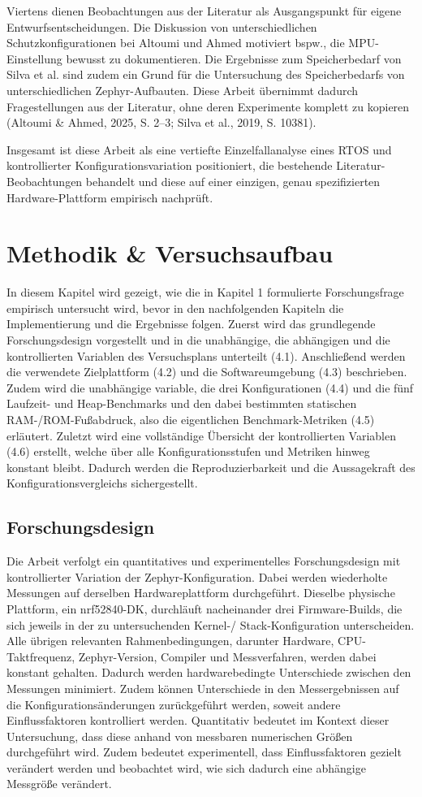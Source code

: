 Viertens dienen Beobachtungen aus der Literatur als Ausgangspunkt für eigene Entwurfsentscheidungen. Die Diskussion von unterschiedlichen Schutzkonfigurationen bei Altoumi und Ahmed motiviert bspw., die MPU-Einstellung bewusst zu dokumentieren. Die Ergebnisse zum Speicherbedarf von Silva et al. sind zudem ein Grund für die Untersuchung des Speicherbedarfs von unterschiedlichen Zephyr-Aufbauten. Diese Arbeit übernimmt dadurch Fragestellungen aus der Literatur, ohne deren Experimente komplett zu kopieren (Altoumi \& Ahmed, 2025, S. 2–3; Silva et al., 2019, S. 10381).

Insgesamt ist diese Arbeit als eine vertiefte Einzelfallanalyse eines RTOS und kontrollierter Konfigurationsvariation positioniert, die bestehende Literatur-Beobachtungen behandelt und diese auf einer einzigen, genau spezifizierten Hardware-Plattform empirisch nachprüft.


\chapter{Methodik \& Versuchsaufbau}
In diesem Kapitel wird gezeigt, wie die in Kapitel 1 formulierte Forschungsfrage empirisch untersucht wird, bevor in den nachfolgenden Kapiteln die Implementierung und die Ergebnisse folgen. Zuerst wird das grundlegende Forschungsdesign vorgestellt und in die unabhängige, die abhängigen und die kontrollierten Variablen des Versuchsplans unterteilt (4.1). Anschließend werden die verwendete Zielplattform (4.2) und die Softwareumgebung (4.3) beschrieben. Zudem wird die unabhängige variable, die drei Konfigurationen (4.4) und die fünf Laufzeit- und Heap-Benchmarks und den dabei bestimmten statischen RAM-/ROM-Fußabdruck, also die eigentlichen Benchmark-Metriken (4.5) erläutert. Zuletzt wird eine vollständige Übersicht der kontrollierten Variablen (4.6) erstellt, welche über alle Konfigurationsstufen und Metriken hinweg konstant bleibt. Dadurch werden die Reproduzierbarkeit und die Aussagekraft des Konfigurationsvergleichs sichergestellt.

\section{Forschungsdesign}
Die Arbeit verfolgt ein quantitatives und experimentelles Forschungsdesign mit kontrollierter Variation der Zephyr-Konfiguration. Dabei werden wiederholte Messungen auf derselben Hardwareplattform durchgeführt. Dieselbe physische Plattform, ein nrf52840-DK, durchläuft nacheinander drei Firmware-Builds, die sich jeweils in der zu untersuchenden Kernel-/ Stack-Konfiguration unterscheiden. Alle übrigen relevanten Rahmenbedingungen, darunter Hardware, CPU-Taktfrequenz, Zephyr-Version, Compiler und Messverfahren, werden dabei konstant gehalten. Dadurch werden hardwarebedingte Unterschiede zwischen den Messungen minimiert. Zudem können Unterschiede in den Messergebnissen auf die Konfigurationsänderungen zurückgeführt werden, soweit andere Einflussfaktoren kontrolliert werden. Quantitativ bedeutet im Kontext dieser Untersuchung, dass diese anhand von messbaren numerischen Größen durchgeführt wird. Zudem bedeutet experimentell, dass Einflussfaktoren gezielt verändert werden und beobachtet wird, wie sich dadurch eine abhängige Messgröße verändert.

